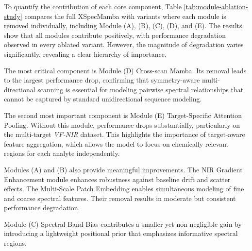\documentclass[pdflatex,sn-mathphys-num]{sn-jnl}%
\begin{document}
To quantify the contribution of each core component, Table \ref{tab:module-ablation-study} compares the full XSpecMamba with variants where each module is removed individually, including Module (A), (B), (C), (D), and (E). The results show that all modules contribute positively, with performance degradation observed in every ablated variant. However, the magnitude of degradation varies significantly, revealing a clear hierarchy of importance.

The most critical component is Module (D) Cross-scan Mamba. Its removal leads to the largest performance drop, confirming that symmetry-aware multi-directional scanning is essential for modeling pairwise spectral relationships that cannot be captured by standard unidirectional sequence modeling.

The second most important component is Module (E) Target-Specific Attention Pooling. Without this module, performance drops substantially, particularly on the multi-target \textit{VF-NIR} dataset. This highlights the importance of target-aware feature aggregation, which allows the model to focus on chemically relevant regions for each analyte independently.

Modules (A) and (B) also provide meaningful improvements. The NIR Gradient Enhancement module enhances robustness against baseline drift and scatter effects. The Multi-Scale Patch Embedding enables simultaneous modeling of fine and coarse spectral features. Their removal results in moderate but consistent performance degradation.

Module (C) Spectral Band Bias contributes a smaller yet non-negligible gain by introducing a lightweight positional prior that emphasizes informative spectral regions.
\end{document}
